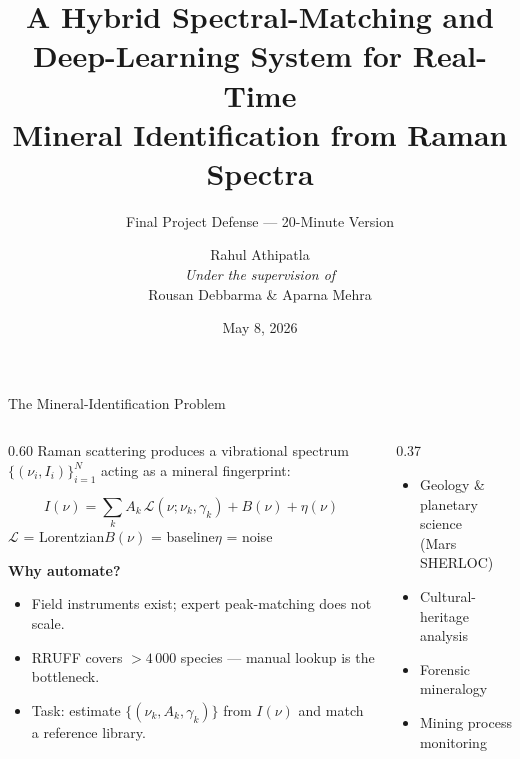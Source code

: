 \documentclass[aspectratio=169,10pt]{beamer}
\title{A Hybrid Spectral-Matching and\\Deep-Learning System for Real-Time\\Mineral Identification from Raman Spectra}
\subtitle{Final Project Defense --- 20-Minute Version}
\author{Rahul Athipatla\\[0.2em]
        \small\textit{Under the supervision of}\\[0.1em]
        \small Rousan Debbarma \& Aparna Mehra}
\institute{Department of Mathematics\\Indian Institute of Technology Delhi}
\date{May 8, 2026}
\begin{document}

\maketitle

\begin{frame}{The Mineral-Identification Problem}
  \begin{columns}[T]
    \begin{column}{0.60\textwidth}
      Raman scattering produces a vibrational spectrum
      $\{(\nu_i,I_i)\}_{i=1}^N$ acting as a mineral fingerprint:
      \vspace{0.15cm}
      \begin{tcolorbox}[mathbox]
        \[
          I(\nu)=\sum_k A_k\,\mathcal{L}(\nu;\nu_k,\gamma_k)+B(\nu)+\eta(\nu)
        \]
        \centering\footnotesize
        $\mathcal{L}$ = Lorentzian\quad$B(\nu)$ = baseline\quad$\eta$ = noise
      \end{tcolorbox}
      \vspace{0.15cm}
      \textbf{Why automate?}
      \begin{itemize}\setlength\itemsep{0.08cm}\small
        \item Field instruments exist; expert peak-matching does not scale.
        \item RRUFF covers $>4\,000$ species --- manual lookup is the bottleneck.
        \item Task: estimate $\{(\nu_k,A_k,\gamma_k)\}$ from $I(\nu)$
              and match a reference library.
      \end{itemize}
    \end{column}
    \begin{column}{0.37\textwidth}
      \begin{tcolorbox}[domainbox, title={Applications}]
        \footnotesize
        \begin{itemize}\setlength\itemsep{0.10cm}
          \item Geology \& planetary science\\(Mars SHERLOC)
          \item Cultural-heritage analysis
          \item Forensic mineralogy
          \item Mining process monitoring
        \end{itemize}
      \end{tcolorbox}
    \end{column}
  \end{columns}
\end{frame}
\end{document}
